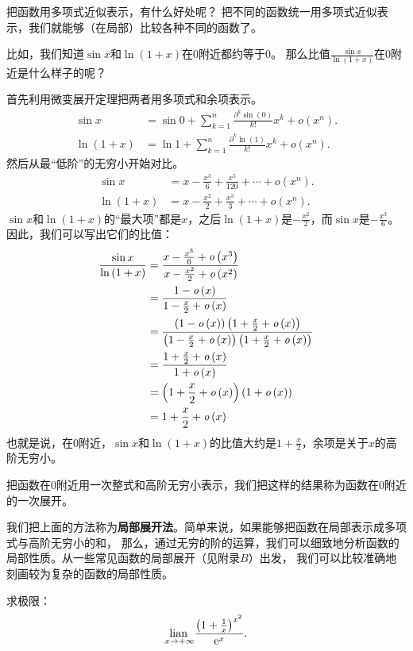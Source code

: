 \documentclass[12pt,UTF8]{ctexbook}
\begin{document}
把函数用多项式近似表示，有什么好处呢？
把不同的函数统一用多项式近似表示，我们就能够（在局部）比较各种不同的函数了。

比如，我们知道$\sin{x}$和$\ln{(1+x)}$在$0$附近都约等于$0$。
那么比值$\frac{\sin{x}}{\ln{(1 + x)}}$在$0$附近是什么样子的呢？

首先利用微变展开定理把两者用多项式和余项表示。
\begin{align*}
    \sin{x} &= \sin{0} + \sum_{k=1}^n \frac{\partial^k \sin (0)}{k!}x^k + \mathit{o}(x^n).  \\
    \ln{(1 + x)} &= \ln{1} + \sum_{k=1}^n \frac{\partial^k \ln (1)}{k!}x^k + \mathit{o}(x^n).  
\end{align*}
然后从最“低阶”的无穷小开始对比。
\begin{align*}
    \sin{x} &= x - \frac{x^3}{6} + \frac{x^5}{120} + \cdots + \mathit{o}(x^n).  \\
    \ln{(1 + x)} &= x - \frac{x^2}{2} + \frac{x^3}{3} + \cdots + \mathit{o}(x^n). 
\end{align*}
$\sin{x}$和$\ln{(1+x)}$的“最大项”都是$x$，之后$\ln{(1+x)}$是$- \frac{x^2}{2}$，而$\sin{x}$是$- \frac{x^3}{6}$。
因此，我们可以写出它们的比值：
\begin{align*}
    \frac{\sin{x}}{\ln{(1 + x)}} &= \frac{x - \frac{x^3}{6} + \mathit{o}\left(x^3\right)}{x - \frac{x^2}{2} + \mathit{o}\left(x^2\right)}  \\
    &= \frac{1 - \mathit{o}\left(x\right)}{1 - \frac{x}{2} + \mathit{o}\left(x\right)}  \\
    &= \frac{(1 - \mathit{o}\left(x\right))\left(1 + \frac{x}{2} + \mathit{o}\left(x\right)\right)}{\left(1 - \frac{x}{2} + \mathit{o}\left(x\right)\right)\left(1 + \frac{x}{2} + \mathit{o}\left(x\right)\right)}  \\
    &= \frac{1 + \frac{x}{2} + \mathit{o}\left(x\right)}{1 + \mathit{o}\left(x\right)}  \\
    &= \left(1 + \frac{x}{2} + \mathit{o}\left(x\right)\right)(1 + \mathit{o}\left(x\right))  \\
    &= 1 + \frac{x}{2} + \mathit{o}\left(x\right) 
\end{align*}
也就是说，在$0$附近，$\sin{x}$和$\ln{(1+x)}$的比值大约是$1 + \frac{x}{2}$，余项是关于$x$的高阶无穷小。

把函数在$0$附近用一次整式和高阶无穷小表示，我们把这样的结果称为函数在$0$附近的一次展开。

我们把上面的方法称为\textbf{局部展开法}。简单来说，如果能够把函数在局部表示成多项式与高阶无穷小的和，
那么，通过无穷的阶的运算，我们可以细致地分析函数的局部性质。从一些常见函数的局部展开（见附录$B$）出发，
我们可以比较准确地刻画较为复杂的函数的局部性质。

\begin{et}
    求极限：
    $$ \underset{x\to +\infty}{\operatorname{lian}\,} \frac{\left(1 + \frac{1}{x}\right)^{x^2}}{\mathrm{e}^x}.$$
\end{et}
\end{document}
